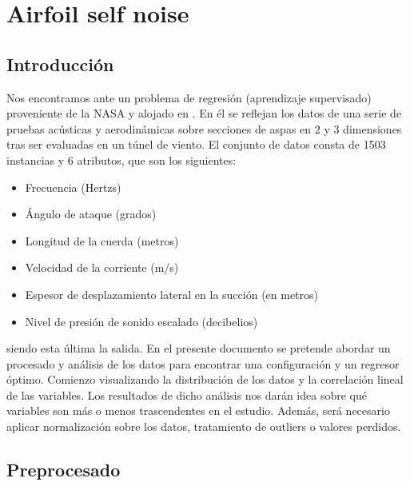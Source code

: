 \newpage 
\section{Airfoil self noise}

\subsection{Introducción}

Nos encontramos ante un problema de regresión (aprendizaje supervisado) proveniente de la NASA y alojado en \cite{airfoil-data}. En él se reflejan los datos de una serie de pruebas acústicas y aerodinámicas sobre secciones de aspas en 2 y 3 dimensiones tras ser evaluadas en un túnel de viento. El conjunto de datos consta de 1503 instancias y 6 atributos, que son los siguientes:

\begin{itemize}
	\item Frecuencia (Hertzs)
	\item Ángulo de ataque (grados)
	\item Longitud de la cuerda (metros)
	\item Velocidad de la corriente (m/s)
	\item Espesor de desplazamiento lateral en la succión (en metros)
	\item Nivel de presión de sonido escalado (decibelios) 
\end{itemize}

siendo esta última la salida. En el presente documento se pretende abordar un procesado y análisis de los datos para encontrar una configuración y un regresor óptimo. Comienzo visualizando la distribución de los datos y la correlación lineal de las variables. Los resultados de dicho análisis nos darán idea sobre qué variables son más o menos trascendentes en el estudio. Además, será necesario aplicar normalización sobre los datos, tratamiento de outliers o valores perdidos.

\newpage

\subsection{Preprocesado}

